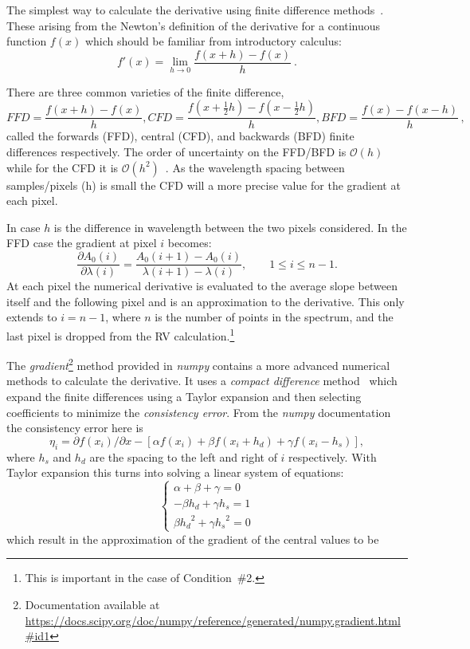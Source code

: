 The simplest way to calculate the derivative using finite difference methods~\citep{quarteroni_numerical_2000}.
These arising from the Newton's definition of the derivative for a continuous function \(f(x)\) which should be familiar from introductory calculus:
\[f'(x) = \lim_{h \to 0} \frac{f(x+h)-f(x)}{h}~.\]

There are three common varieties of the finite difference,
\begin{equation}
 {FFD} = \frac{f(x+h)-f(x)}{h}, {CFD}=\frac{f(x+\frac{1}{2}h)-f(x-\frac{1}{2}h)}{h}, {BFD}=\frac{f(x)-f(x-h)}{h}\,,
\end{equation}
called the forwards ({FFD}), central ({CFD}), and backwards ({BFD}) finite differences respectively.
The order of uncertainty on the {FFD}/{BFD} is \(\mathcal{O}(h)\) while for the {CFD} it is \(\mathcal{O}({h}^{2})\)~\citep{quarteroni_numerical_2000}.
As the wavelength spacing between samples/pixels (h) is small the {CFD} will a more precise value for the gradient at each pixel.

In  case \(h\) is the difference in wavelength between the two pixels considered.
In the {FFD} case the gradient at pixel \(i\) becomes:
\begin{equation}
\frac{\partial A_0(i)}{\partial\lambda(i)} = \frac{A_0(i+1) - A_0(i)}{\lambda(i+1)-\lambda(i)}, \hspace{2em} 1 \leq i \leq n-1.
\label{eqn:ffd_precision}
\end{equation}
At each pixel the numerical derivative is evaluated to the average slope between itself and the following pixel and is an approximation to the derivative.
This only extends to \(i= n-1\), where \(n\) is the number of points in the spectrum, and the last pixel is dropped from the {RV} calculation.\footnote{This is important in the case of Condition~\#2.}


The \emph{gradient}\footnote{Documentation available at \href{https://docs.scipy.org/doc/numpy/reference/generated/numpy.gradient.html\#id1 }{https://docs.scipy.org/doc/numpy/reference/generated/numpy.gradient.html\#id1}}  method provided in \emph{numpy} contains a more advanced numerical methods to calculate the derivative.
It uses a \textit{compact difference} method~\citep{quarteroni_numerical_2000} which expand the finite differences using a Taylor expansion and then selecting coefficients to minimize the \textit{consistency error}.
From the \emph{numpy} documentation the consistency error here is \[\eta_i = \partial{f(x_i)}/\partial{x} -  [\alpha f(x_i) + \beta f(x_i +h_d) + \gamma f(x_i - h_s)],\] where \(h_s\) and \(h_d\) are the spacing to the left and right of \(i\) respectively.
With Taylor expansion this turns into solving a linear system of equations:
\[\begin{cases}
         \alpha + \beta + \gamma = 0\\
         -\beta {h_d} + \gamma {h_s} = 1\\
         \beta {h_{d}}^{2} + \gamma {h_{s}}^{2} = 0
    \end{cases}
\]
which result in the approximation of the gradient of the central values to be

